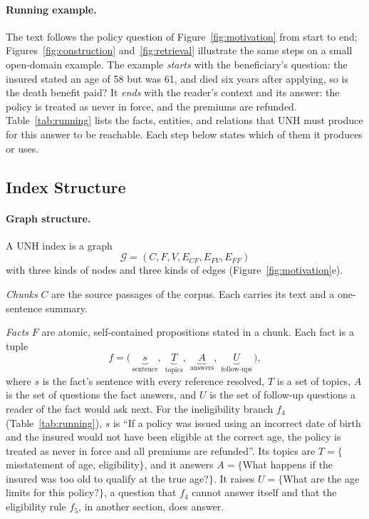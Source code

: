 \documentclass[sigconf, review, anonymous]{acmart}
\newcommand{\sys}{UNH}
\newcommand{\Ecf}{E_{CF}}
\newcommand{\Efv}{E_{FV}}
\newcommand{\Eff}{E_{FF}}
\begin{document}
\paragraph{\textbf{Running example.}}
The text follows the policy question of Figure~\ref{fig:motivation} from start to end; Figures~\ref{fig:construction} and~\ref{fig:retrieval} illustrate the same steps on a small open-domain example. The example \emph{starts} with the beneficiary's question: the insured stated an age of 58 but was 61, and died six years after applying, so is the death benefit paid? It \emph{ends} with the reader's context and its answer: the policy is treated as never in force, and the premiums are refunded. Table~\ref{tab:running} lists the facts, entities, and relations that \sys{} must produce for this answer to be reachable. Each step below states which of them it produces or uses.

\subsection{Index Structure}
\label{sec:index}

\paragraph{\textbf{Graph structure.}}
A \sys{} index is a graph
\[
  \mathcal{G} = (C, F, V, \Ecf, \Efv, \Eff)
\]
with three kinds of nodes and three kinds of edges (Figure~\ref{fig:motivation}e).

\textit{Chunks} $C$ are the source passages of the corpus. Each carries its text and a one-sentence summary.

\textit{Facts} $F$ are atomic, self-contained propositions stated in a chunk. Each fact is a tuple
\[
  f = \bigl(\,\underbrace{s}_{\text{sentence}},\;
             \underbrace{T}_{\text{topics}},\;
             \underbrace{A}_{\text{answers}},\;
             \underbrace{U}_{\text{follow-ups}}\,\bigr),
\]
where $s$ is the fact's sentence with every reference resolved, $T$ is a set of topics, $A$ is the set of questions the fact answers, and $U$ is the set of follow-up questions a reader of the fact would ask next. For the ineligibility branch $f_4$ (Table~\ref{tab:running}), $s$ is ``If a policy was issued using an incorrect date of birth and the insured would not have been eligible at the correct age, the policy is treated as never in force and all premiums are refunded''. Its topics are $T = \{$misstatement of age, eligibility$\}$, and it answers $A = \{$What happens if the insured was too old to qualify at the true age?$\}$. It raises $U = \{$What are the age limits for this policy?$\}$, a question that $f_4$ cannot answer itself and that the eligibility rule $f_5$, in another section, does answer.
\end{document}
